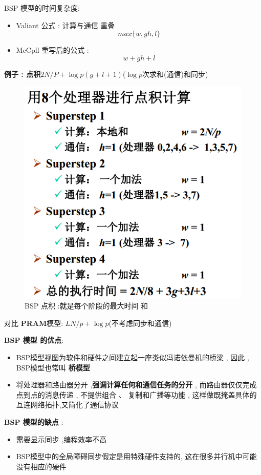 \documentclass[UTF8,a4paper]{ctexart}
\begin{document}
  BSP 模型的时间复杂度:
  \begin{itemize}
    \item Valiant 公式 : 计算与通信 重叠
    \[max\{w,  gh , l\}\]
    \item McCpll 重写后的公式 :
    \[w + gh + l\]
  \end{itemize}

  \textbf{例子 : 点积}$2N / P + \log p(g + l  +1)$($\log p$次求和(通信)和同步)
  \begin{figure}[H]
    \centering
    \includegraphics[scale = 0.3]{assets/ParallelComputing_bbb01.png}
    \caption{BSP 点积 :就是每个阶段的最大时间 和}
  \end{figure}

  对比 \textbf{PRAM}模型: $LN / p + \log p$(不考虑同步和通信)

  \textbf{BSP 模型 的优点}:
  \begin{itemize}
    \item BSP模型视图为软件和硬件之间建立起一座类似冯诺依曼机的桥梁 , 因此 , BSP模型也常叫 \textbf{桥模型}
    \item 将处理器和路由器分开 ,\textbf{强调计算任何和通信任务的分开} , 而路由器仅仅完成点到点的消息传递 , 不提供组合 、 复制和广播等功能 , 这样做既掩盖具体的互连网络拓扑,又简化了通信协议
  \end{itemize}

  \textbf{BSP 模型的缺点} :
  \begin{itemize}
    \item 需要显示同步 ,编程效率不高
    \item BSP模型中的全局障碍同步假定是用特殊硬件支持的, 这在很多并行机中可能没有相应的硬件
  \end{itemize}
\end{document}
